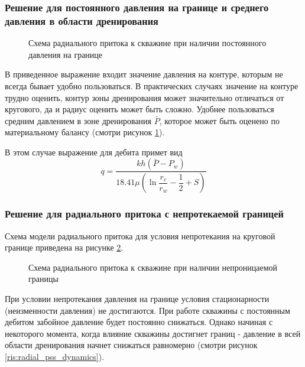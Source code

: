\subsubsection{Решение для постоянного давления на границе и среднего давления в области дренирования}

\begin{figure}[h!]
	\begin{center}
		
		\caption{Схема радиального притока к скважине при наличии постоянного давления на границе}
		\label{ris:radial_inflow_steady_state_average_pressure}
	\end{center}
\end{figure}

В приведенное выражение входит значение давления на контуре, которым не всегда бывает удобно пользоваться. В практических случаях значение на контуре трудно оценить, контур зоны дренирования может значительно отличаться от кругового, да и радиус оценить может быть сложно. Удобнее пользоваться средним давлением в зоне дренирования $\bar{P}$, которое может быть оценено по материальному балансу (смотри рисунок \ref{ris:radial_inflow_steady_state_average_pressure}). 



В этом случае выражение для дебита примет вид
$$q=\frac{kh\left( \bar{P}-P_w\right)}{ 18.41 \mu\left(\ln{\dfrac{r_e}{r_w}}  - \dfrac{1}{2}+ S \right)}$$


\subsubsection{Решение для радиального притока с непротекаемой границей}

Схема модели радиального притока для условия непротекания на круговой границе приведена на рисунке \ref{ris:radial_inflow_steady_state_2}.

\begin{figure}[h!]
	\begin{center}
		
		\caption{Схема радиального притока к скважине при наличии непроницаемой границы}
		\label{ris:radial_inflow_steady_state_2}
	\end{center}
\end{figure}

При условии непротекания давления на границе условия стационарности (неизменности давления) не достигаются. При работе скважины с постоянным дебитом забойное давление будет постоянно снижаться. Однако начиная с некоторого момента, когда влияние скважины достигнет границ - давление в всей области дренирования начнет снижаться равномерно (смотри рисунок \ref{ris:radial_pss_dynamics}). 

